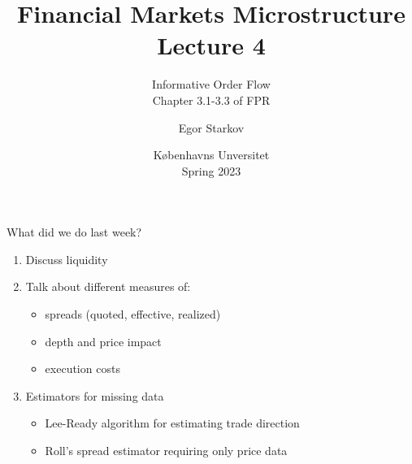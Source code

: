 \documentclass[english,10pt
,aspectratio=169
]{beamer}
\title{Financial Markets Microstructure \\ Lecture 4}
\subtitle{Informative Order Flow\\
	Chapter 3.1-3.3 of FPR}
\author{Egor Starkov}
\date{K{\o}benhavns Unversitet \\
	Spring 2023}
\begin{document}
\frame[plain]{\titlepage}


\begin{frame}{What did we do last week?}
\begin{enumerate}
	\item Discuss liquidity
	\item Talk about different measures of:
	\begin{itemize}
		\item spreads (quoted, effective, realized)
		\item depth and price impact
		\item execution costs
	\end{itemize}
	\item Estimators for missing data
	\begin{itemize}
		\item Lee-Ready algorithm for estimating trade direction
		\item Roll's spread estimator requiring only price data
	\end{itemize}
\end{enumerate}
\end{frame}


\end{document}
